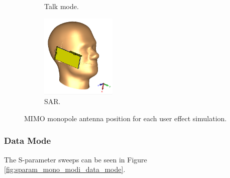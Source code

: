 \begin{figure}[htbp]
\begin{subfigure}[b]{0.24\linewidth}
        \caption{Talk mode.}
    \end{subfigure}
    \begin{subfigure}[b]{0.24\linewidth}
        \centering \includegraphics[width=\linewidth,height=4cm,keepaspectratio]{img/tech_sol/monopole/highband/ue/sar/3d_sar.PNG}
        \caption{SAR.}
    \end{subfigure}
    \caption{MIMO monopole antenna position for each user effect simulation.}
    \label{fig:position_mono_modi}
\end{figure}

\FloatBarrier
\subsubsection{Data Mode}
The S-parameter sweeps can be seen in Figure \ref{fig:sparam_mono_modi_data_mode}.

